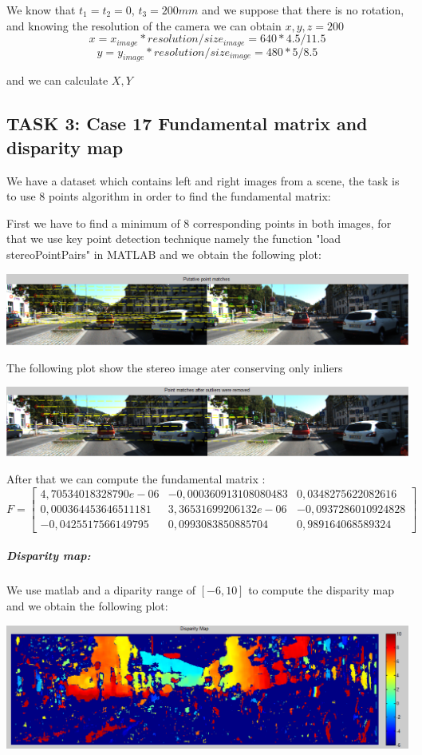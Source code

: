 \documentclass[12pt,a4paper]{report}
\begin{document}
We know that $t_{1}=t_{2}=0$, $t_{3}=200mm$ and we suppose that there is no rotation, and knowing the resolution of the camera we can obtain $x, y, z=200$ 
$$x=x_{image}*resolution/size_{image}=640*4.5/11.5$$
$$y=y_{image}*resolution/size_{image}=480*5/8.5$$

and we can calculate $X,Y$


\subsection{TASK 3: Case 17 Fundamental matrix and disparity map}

We have a dataset which contains left and right images from a scene, the task is to use 8 points algorithm in order to find the fundamental matrix:

First we have to find a minimum of 8 corresponding points in both images, for that we use key point detection technique namely the function "load stereoPointPairs" in MATLAB and we obtain the following plot:

\begin{center}
\includegraphics[width=17cm]{Capture3.png}
\end{center}
 
The following plot show the stereo image ater conserving only inliers 
\begin{center}
\includegraphics[width=17cm]{Capture4.png}
\end{center}

After that we can compute the fundamental matrix :
$$F= \left[ \begin{array}{ccc}
4,70534018328790e-06	& -0,000360913108080483	& 0,0348275622082616\\
0,000364453646511181	& 3,36531699206132e-06	& -0,0937286010924828\\
-0,0425517566149795	& 0,0993083850885704	& 0,989164068589324 \end{array} \right]$$

\subparagraph{Disparity map:}
We use matlab and a diparity range of $[-6, 10]$ to compute the disparity map and we obtain the following plot:
\begin{center}
\includegraphics[width=17cm]{Capture5.png}
\end{center}
\end{document}
